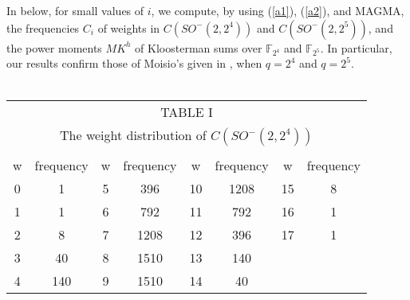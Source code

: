 \documentclass[a4,12pt]{elsart}
\begin{document}
In below, for small values of $i$, we compute, by using (\ref{a1}),
(\ref{a2}), and MAGMA, the frequencies  $C_i$ of weights in
$C(SO^{-}(2,2^4))$ and $C(SO^{-}(2,2^5))$, and the power moments
$MK^h$ of Kloosterman sums over ${\mathbb{F}}_{2^4}$ and ${\mathbb{F}}_{2^5}$. In
particular, our results
confirm those of Moisio's given in \cite{M1}, when $q=2^4$ and $q=2^5$.\\
\\

\begin{table}[!htp]
\begin{center}
\begin{tabular}{c c c c c c c c }
\multicolumn{8}{c}{TABLE I} \\
\multicolumn{8}{c}{The weight distribution of $C(SO^{-}(2,2^{4}))$} \\
\\
\hline
w & frequency & w& frequency & w& frequency &w& frequency\\[0.5pt]
\hline
  0   &     1       &     5   &    396    &      10    &  1208    &     15 & 8 \\
  1   &     1       &     6   &    792    &       11   &    792   &     16 &1 \\
  2   &     8       &     7   &   1208    &       12   &    396   &     17 &1 \\
  3   &    40       &     8   &   1510    &       13   &    140 \\
  4   &    140      &     9   &   1510    &       14   &     40 \\
 \hline
\end{tabular}
\end{center}
\end{table}
\end{document}
